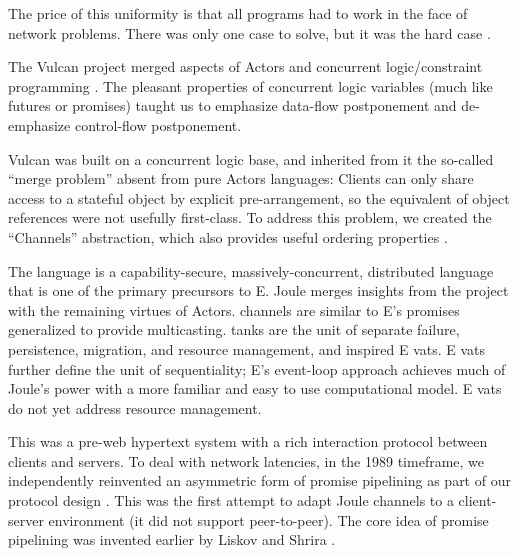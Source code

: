 \documentclass{llncs}
\begin{document}
The price of this uniformity is that all programs had to work
in the face of network problems. There was only one case to solve, but
it was the hard case \cite{waldo:note}.

 The Vulcan project \cite{kahn:vulcan}
merged aspects of Actors and concurrent logic/constraint programming
\cite{tr003,Saraswat93,janus}. The pleasant properties of concurrent
logic variables (much like futures or promises) taught us to emphasize
data-flow postponement and de-emphasize control-flow
postponement. 


Vulcan was built on a concurrent logic base, and inherited from 
it the so-called ``merge problem'' \cite{Shapiro:merge} absent from
pure Actors languages: Clients can only share access to a stateful
object by explicit pre-arrangement, so the equivalent of object
references were not usefully first-class. To address this problem, we
created the ``Channels'' abstraction, which also provides useful
ordering properties \cite{tribble:channels}.

 The  language \cite{tribble:joule} is a
capability-secure, massively-concurrent, distributed language that is
one of the primary precursors to E. Joule merges insights from the
 project with the remaining virtues of Actors. 
channels are similar to E's promises generalized to provide
multicasting.  tanks are the unit of separate failure,
persistence, migration, and resource management, and inspired E vats.
E vats further define the unit of sequentiality; E's event-loop
approach achieves much of Joule's power with a more familiar and easy
to use computational model. E vats do not yet address resource
management.


 This was a pre-web
hypertext system with a rich interaction protocol between clients and
servers. To deal with network latencies, in the 1989 timeframe, we
independently reinvented an asymmetric form of promise pipelining as
part of our protocol design \cite{gold:promises}. This was the first
attempt to adapt Joule channels to a client-server environment (it did
not support peer-to-peer). The core idea of promise pipelining was
invented earlier by Liskov and Shrira \cite{liskov:promises}.
\end{document}
